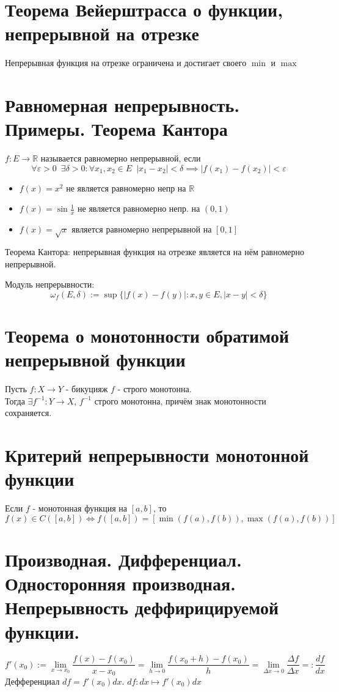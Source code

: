 \documentclass[11pt, a4paper]{article}
\def\R{\mathbb{R}}
\def\sp{\, \, \,}
\begin{document}
    \section{Теорема Вейерштрасса о функции, непрерывной на отрезке}
    Непрерывная функция на отрезке ограничена и достигает своего $\min$ и $\max$

    \section{Равномерная непрерывность. Примеры. Теорема Кантора}
    $f: E \to \R$ называется равномерно непрерывной, если
    $$\forall \varepsilon > 0 \sp \exists \delta > 0: \forall x_1, x_2 \in E \sp |x_1 - x_2| < \delta \implies |f(x_1) - f(x_2)| < \varepsilon$$
    \begin{itemize}
        \item $f(x) = x^2$ не является равномерно непр на $\R$
        \item $f(x) = \sin \frac{1}{x}$ не является равномерно непр. на $(0, 1)$
        \item $f(x) = \sqrt{x}$ является равномерно непрерывной на $[0, 1]$
    \end{itemize}
    Теорема Кантора: непрерывная функция на отрезке является на нём равномерно непрерывной.

    Модуль непрерывности:
    $$\omega _f (E, \delta) := \sup \{|f(x) - f(y)|: x, y \in E, |x-y| < \delta\}$$

    \section{Теорема о монотонности обратимой непрерывной функции}
    Пусть $f: X \to Y$ - бикуцияж $f$ - строго монотонна.\\
    Тогда $\exists f^{-1} : Y \to X$, $f^{-1}$ строго монотонна, причём знак монотонности сохраняется.

    \section{Критерий непрерывности монотонной функции}
    Если $f$ - монотонная функция на $[a, b]$, то
    $$f(x) \in C([a, b]) \iff f([a, b]) = [\min (f(a), f(b)), \max (f(a), f(b))]$$

    \section{Производная. Дифференциал. Односторонняя производная. Непрерывность деффирицируемой функции.}
    $$f' (x_0) := \lim_{x \to x_0} \frac{f(x) - f(x_0)}{x-x_0} = \lim_{h \to 0} \frac{f(x_0 + h) - f(x_0)}{h} = \lim_{\Delta x \to 0} \frac{\Delta f}{\Delta x} =: \frac{df}{dx}$$
    Дефференциал $df = f'(x_0) dx$. $df: dx \mapsto f'(x_0) dx$
\end{document}
